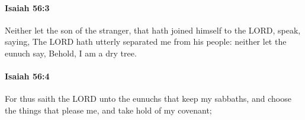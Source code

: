 		\paragraph{Isaiah 56:3} %
			\label{ISAIAH-56-3}

			Neither let the son of the stranger, that hath joined himself to the LORD, speak, saying, The LORD hath utterly separated me from his people: neither let the eunuch say, Behold, I am a dry tree.


		\paragraph{Isaiah 56:4} %
			\label{ISAIAH-56-4}

			For thus saith the LORD unto the eunuchs that keep my sabbaths, and choose the things that please me, and take hold of my covenant;


